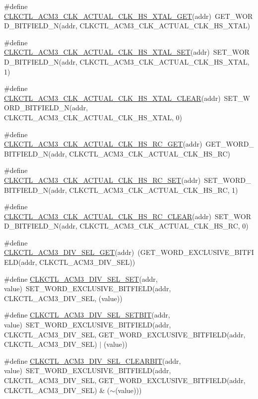 \begin{DoxyCompactItemize}
\item 
\#define \hyperlink{a00544_aa1285b33f1a1abb72dd7d071685bb06b}{CLKCTL\_\-ACM3\_\-CLK\_\-ACTUAL\_\-CLK\_\-HS\_\-XTAL\_\-GET}(addr)~GET\_\-WORD\_\-BITFIELD\_\-N(addr, CLKCTL\_\-ACM3\_\-CLK\_\-ACTUAL\_\-CLK\_\-HS\_\-XTAL)
\item 
\#define \hyperlink{a00544_a1c670780ce44f24edd2c01f02586506c}{CLKCTL\_\-ACM3\_\-CLK\_\-ACTUAL\_\-CLK\_\-HS\_\-XTAL\_\-SET}(addr)~SET\_\-WORD\_\-BITFIELD\_\-N(addr, CLKCTL\_\-ACM3\_\-CLK\_\-ACTUAL\_\-CLK\_\-HS\_\-XTAL, 1)
\item 
\#define \hyperlink{a00544_ab60f9e05e868d62d743c4badffc779f9}{CLKCTL\_\-ACM3\_\-CLK\_\-ACTUAL\_\-CLK\_\-HS\_\-XTAL\_\-CLEAR}(addr)~SET\_\-WORD\_\-BITFIELD\_\-N(addr, CLKCTL\_\-ACM3\_\-CLK\_\-ACTUAL\_\-CLK\_\-HS\_\-XTAL, 0)
\item 
\#define \hyperlink{a00544_a279252a6839e3688b0f44e03cb208e8e}{CLKCTL\_\-ACM3\_\-CLK\_\-ACTUAL\_\-CLK\_\-HS\_\-RC\_\-GET}(addr)~GET\_\-WORD\_\-BITFIELD\_\-N(addr, CLKCTL\_\-ACM3\_\-CLK\_\-ACTUAL\_\-CLK\_\-HS\_\-RC)
\item 
\#define \hyperlink{a00544_a92565008bf54016c23c78d34e9641543}{CLKCTL\_\-ACM3\_\-CLK\_\-ACTUAL\_\-CLK\_\-HS\_\-RC\_\-SET}(addr)~SET\_\-WORD\_\-BITFIELD\_\-N(addr, CLKCTL\_\-ACM3\_\-CLK\_\-ACTUAL\_\-CLK\_\-HS\_\-RC, 1)
\item 
\#define \hyperlink{a00544_a58c77c74727e4093d0f233af16f60975}{CLKCTL\_\-ACM3\_\-CLK\_\-ACTUAL\_\-CLK\_\-HS\_\-RC\_\-CLEAR}(addr)~SET\_\-WORD\_\-BITFIELD\_\-N(addr, CLKCTL\_\-ACM3\_\-CLK\_\-ACTUAL\_\-CLK\_\-HS\_\-RC, 0)
\item 
\#define \hyperlink{a00544_a0aaa4b5946fd74b877032a1dba8a522a}{CLKCTL\_\-ACM3\_\-DIV\_\-SEL\_\-GET}(addr)~(GET\_\-WORD\_\-EXCLUSIVE\_\-BITFIELD(addr, CLKCTL\_\-ACM3\_\-DIV\_\-SEL))
\item 
\#define \hyperlink{a00544_a0152edd5cb9f73d024812918b5968180}{CLKCTL\_\-ACM3\_\-DIV\_\-SEL\_\-SET}(addr, value)~SET\_\-WORD\_\-EXCLUSIVE\_\-BITFIELD(addr, CLKCTL\_\-ACM3\_\-DIV\_\-SEL, (value))
\item 
\#define \hyperlink{a00544_affd48c7e2f8b55aef1f6ae7937a8b895}{CLKCTL\_\-ACM3\_\-DIV\_\-SEL\_\-SETBIT}(addr, value)~SET\_\-WORD\_\-EXCLUSIVE\_\-BITFIELD(addr, CLKCTL\_\-ACM3\_\-DIV\_\-SEL, GET\_\-WORD\_\-EXCLUSIVE\_\-BITFIELD(addr, CLKCTL\_\-ACM3\_\-DIV\_\-SEL) $|$ (value))
\item 
\#define \hyperlink{a00544_ab999fe9f64124e578da7791799068fbe}{CLKCTL\_\-ACM3\_\-DIV\_\-SEL\_\-CLEARBIT}(addr, value)~SET\_\-WORD\_\-EXCLUSIVE\_\-BITFIELD(addr, CLKCTL\_\-ACM3\_\-DIV\_\-SEL, GET\_\-WORD\_\-EXCLUSIVE\_\-BITFIELD(addr, CLKCTL\_\-ACM3\_\-DIV\_\-SEL) \& ($\sim$(value)))

\end{DoxyCompactItemize}

